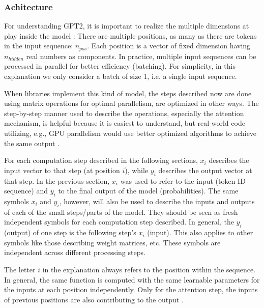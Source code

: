 \subsubsection{Achitecture}

For understanding GPT2, it is important to realize the multiple dimensions at play inside the model \cite{alammar-gpt2} :
There are multiple positions, as many as there are tokens in the input sequence: $n_{pos}$.
Each position is a vector of fixed dimension having $n_{hidden}$ real numbers as components.
In practice, multiple input sequences can be processed in parallel for better efficiency (batching).
For simplicity, in this explanation we only consider a batch of size 1, i.e. a single input sequence.

When libraries implement this kind of model, the steps described now are done using matrix operations
for optimal parallelism, are optimized in other ways. The step-by-step manner used to describe the operations,
especially the attention mechanism, is helpful because it is easiest to understand, but real-world code
utilizing, e.g., GPU parallelism would use better optimized algorithms to achieve the same output \cite{choi2023unleashing} . 

For each computation step described in the following sections, $x_i$ describes the input vector to that step (at position $i$), while $y_i$ describes the output vector
at that step. In the previous section, $x_i$ was used to refer to the input (token ID sequence) and $y_i$ to the final output of the model (probabilities).
The same symbols $x_i$ and $y_i$, however, will also be used to describe the inputs and outputs of each of the small steps/parts of the model.
They should be seen as fresh independent symbols for each computation step described. In general, the $y_i$ (output) of one step is the following step's $x_i$ (input).
This also applies to other symbols like those describing weight matrices, etc. These symbols are independent across different processing steps.

The letter $i$ in the explanation always refers to the position within the sequence. In general, the same function is computed with the same learnable parameters
for the inputs at each position independently. Only for the attention step, the inputs of previous positions are also contributing to the output \cite{alammar-gpt2}.


